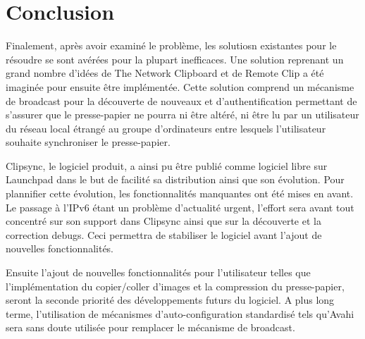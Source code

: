 \chapter*{Conclusion}
\renewcommand{\leftmark}{CONCLUSION}
Finalement, après avoir examiné le problème, les solutiosn existantes
pour le résoudre se sont avérées pour la plupart inefficaces. Une solution
reprenant un grand nombre d'idées de The Network Clipboard et de Remote
Clip a été imaginée pour ensuite être implémentée. Cette solution
comprend un mécanisme de broadcast pour la découverte de nouveaux et
d'authentification permettant de s'assurer que le presse-papier ne pourra ni
être altéré, ni être lu par un utilisateur du réseau local étrangé au groupe
d'ordinateurs entre lesquels l'utilisateur souhaite synchroniser le
presse-papier.

Clipsync, le logiciel produit, a ainsi pu être publié comme logiciel libre sur
Launchpad dans le but de facilité sa distribution ainsi que son évolution.
Pour plannifier cette évolution, les fonctionnalités manquantes ont été mises
en avant.
Le passage à l'IPv6 étant un problème d'actualité urgent, l'effort
sera avant tout concentré sur son support dans Clipsync ainsi que sur la
découverte et la correction debugs. Ceci permettra de stabiliser le logiciel
avant l'ajout de nouvelles fonctionnalités.

Ensuite l'ajout de nouvelles fonctionnalités pour l'utilisateur telles que
l'implémentation du copier/coller d'images et la compression du presse-papier,
seront la seconde priorité des développements futurs du logiciel.
A plus long terme, l'utilisation de mécanismes d'auto-configuration
standardisé tels qu'Avahi sera sans doute utilisée pour remplacer le mécanisme
de broadcast.